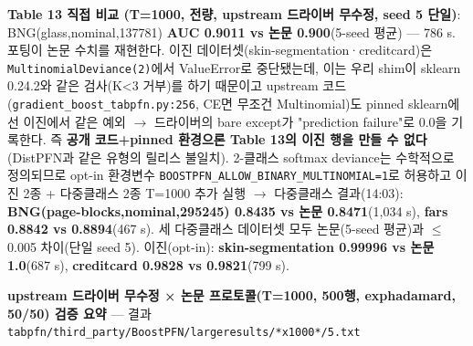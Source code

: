 \par\noindent \textbullet\enspace \textbf{Table 13 직접 비교 (T=\allowbreak{}1000, 전량, upstream 드라이버 무수정, seed 5 단일)}: BNG(glass,nominal,137781) \textbf{AUC 0.9011 vs 논문 0.900}(5-seed 평균) — 786 s. 포팅이 논문 수치를 재현한다. 이진 데이터셋(skin-segmentation·creditcard)은 \texttt{Multinom\allowbreak{}ialDevia\allowbreak{}nce(2)}에서 ValueError로 중단됐는데, 이는 우리 shim이 sklearn 0.24.2와 같은 검사(K<3 거부)를 하기 때문이고 upstream 코드(\texttt{gradient\allowbreak{}\_\allowbreak{}\allowbreak{}boost\_\allowbreak{}\allowbreak{}t\allowbreak{}abpfn.\allowbreak{}py\allowbreak{}:256}, CE면 무조건 Multinomial)도 pinned sklearn에선 이진에서 같은 예외  \ensuremath{\rightarrow}  드라이버의 bare except가 "prediction failure"로 0.0을 기록한다. 즉 \textbf{공개 코드+\allowbreak{}pinned 환경으론 Table 13의 이진 행을 만들 수 없다}(DistPFN과 같은 유형의 릴리스 불일치). 2-클래스 softmax deviance는 수학적으로 정의되므로 opt-in 환경변수 \texttt{BOOSTPFN\allowbreak{}\_\allowbreak{}\allowbreak{}ALLOW\_\allowbreak{}\allowbreak{}B\allowbreak{}INARY\_\allowbreak{}\allowbreak{}MU\allowbreak{}LTINOMIA\allowbreak{}L=\allowbreak{}\allowbreak{}1}로 허용하고 이진 2종 +\allowbreak{} 다중클래스 2종 T=\allowbreak{}1000 추가 실행  \ensuremath{\rightarrow}  다중클래스 결과(14:03): \textbf{BNG(page-blocks,nominal,295245) 0.8435 vs 논문 0.8471}(1,034 s), \textbf{fars 0.8842 vs 0.8894}(467 s). 세 다중클래스 데이터셋 모두 논문(5-seed 평균)과 \ensuremath{\leq}0.005 차이(단일 seed 5). 이진(opt-in): \textbf{skin-segmentation 0.99996 vs 논문 1.0}(687 s), \textbf{creditcard 0.9828 vs 0.9821}(799 s).

\textbf{upstream 드라이버 무수정 × 논문 프로토콜(T=\allowbreak{}1000, 500행, exphadamard, 50/\allowbreak{}50) 검증 요약} — 결과 \texttt{tabpfn/\allowbreak{}\allowbreak{}t\allowbreak{}hird\_\allowbreak{}\allowbreak{}par\allowbreak{}ty/\allowbreak{}\allowbreak{}Boost\allowbreak{}PFN/\allowbreak{}\allowbreak{}larg\allowbreak{}eresults\allowbreak{}/\allowbreak{}\allowbreak{}*x1000*\allowbreak{}/\allowbreak{}\allowbreak{}5.\allowbreak{}txt}


